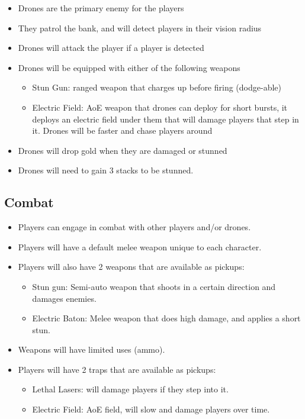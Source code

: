 \documentclass[10pt]{report}
\begin{document}
\begin{itemize}
    \item Drones are the primary enemy for the players
    \item They patrol the bank, and will detect players in their vision radius
    \item Drones will attack the player if a player is detected
    \item Drones will be equipped with either of the following weapons
    \begin{itemize}
        \item Stun Gun: ranged weapon that charges up before firing (dodge-able)
        \item Electric Field: AoE weapon that drones can deploy for short bursts, it deploys an electric field under them that will damage players that step in it. Drones will be faster and chase players around
    \end{itemize}
    \item Drones will drop gold when they are damaged or stunned
    \item Drones will need to gain 3 stacks to be stunned.
\end{itemize}

\subsection{Combat}

\begin{itemize}
    \item Players can engage in combat with other players and/or drones.
    \item Players will have a default melee weapon unique to each character.
    \item Players will also have 2 weapons that are available as pickups:
    \begin{itemize}
        \item Stun gun: Semi-auto weapon that shoots in a certain direction and damages enemies.
        \item Electric Baton: Melee weapon that does high damage, and applies a short stun.
    \end{itemize}
    \item Weapons will have limited uses (ammo).
    \item Players will have 2 traps that are available as pickups:
    \begin{itemize}
        \item Lethal Lasers: will damage players if they step into it.
        \item Electric Field: AoE field, will slow and damage players over time.
    \end{itemize}
\end{itemize}
\end{document}
